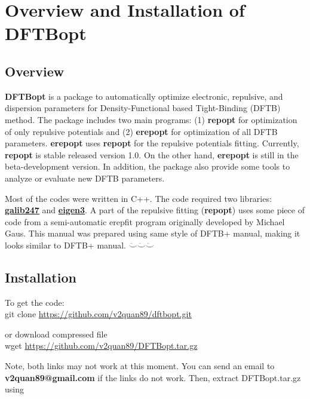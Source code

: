 \chapter{Overview and Installation of DFTBopt}

\label{chap:install}

\section{Overview}

\textbf{DFTBopt}\cite{Vuong2018} is a package to automatically optimize
electronic, repulsive, and dispersion parameters for Density-Functional
based Tight-Binding (DFTB) method. The package includes two main programs:
(1) \textbf{repopt} for optimization of only repulsive potentials and (2)
\textbf{erepopt} for optimization of all DFTB parameters. \textbf{erepopt}
uses \textbf{repopt} for the repulsive potentials fitting. Currently,
\textbf{repopt} is stable released version 1.0. On the other hand,
\textbf{erepopt} is still in the beta-development version. In addition, the
package also provide some tools to analyze or evaluate new DFTB parameters.

Most of the codes were written in C++. The code required two libraries:
\href{http://lancet.mit.edu/ga/}{\textbf{galib247}} and
\href{http://eigen.tuxfamily.org/index.php?title=Main_Page}{\textbf{eigen3}}.
A part of the repulsive fitting (\textbf{repopt}) uses some piece of code
from a semi-automatic erepfit program originally developed by Michael
Gaus.\cite{Gaus2009} This manual was prepared using same style of DFTB+ manual,
making it looks similar to DFTB+ manual. $\ddot\smile\ddot\smile\ddot\smile$

\section{Installation}

To get the code:\\
{\scriptsize
git clone
\href{https://github.com/v2quan89/dftbopt.git}{https://github.com/v2quan89/dftbopt.git}
}

or download compressed file\\
{\scriptsize
wget \href{https://github.com/v2quan89/DFTBopt.tar.gz}{https://github.com/v2quan89/DFTBopt.tar.gz}
}

Note, both links may not work at this moment. You can send an email to
\textbf{v2quan89@gmail.com} if the links do not work.  Then, extract
DFTBopt.tar.gz using

